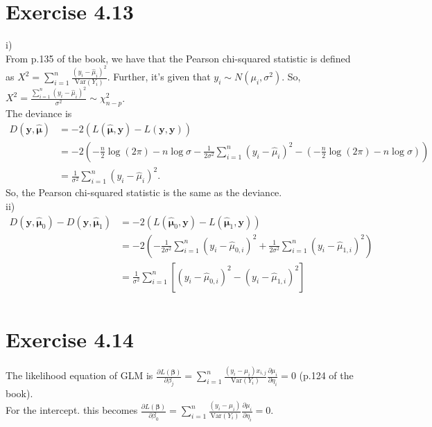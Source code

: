 \documentclass[a4paper]{article}
\newcommand{\Var}{\mathrm{Var}}
\begin{document}
\vspace{\baselineskip}
\section{Exercise 4.13}
i)\\
From p.135 of the book, we have that the Pearson chi-squared statistic is defined as $X^{2} = \sum_{i=1}^{n} \frac{(y_{i} - \widehat{\mu}_{i})^{2}}{\Var(Y_{i})}$. Further, it's given that $y_{i} \sim N(\mu_{i},\sigma^{2})$. So, $X^{2} = \frac{\sum_{i=1}^{n}(y_{i} - \widehat{\mu}_{i})^{2}}{\sigma^{2}} \sim \chi_{n-p}^{2}$.\\

The deviance is
\begin{align*}
D(\bm{y},\widehat{\bm{\mu}}) &= -2\left(L\left(\widehat{\bm{\mu}},\bm{y}\right) - L\left(\bm{y},\bm{y}\right)\right)\\
&= -2\left(-\frac{n}{2}\log(2\pi) -n\log\sigma - \frac{1}{2\sigma^{2}}\sum_{i=1}^{n}(y_{i} - \widehat{\mu}_{i})^{2} -\left(-\frac{n}{2}\log(2\pi) -n\log\sigma\right)\right)\\
&= \frac{1}{\sigma^{2}}\sum_{i=1}^{n}(y_{i} - \widehat{\mu}_{i})^{2}.
\end{align*}
So, the Pearson chi-squared statistic is the same as the deviance.\\

ii)
\begin{align*}
D(\bm{y},\widehat{\bm{\mu}}_{0}) - D(\bm{y},\widehat{\bm{\mu}}_{1}) &= -2\left(L\left(\widehat{\bm{\mu}}_{0},\bm{y}\right) - L\left(\widehat{\bm{\mu}}_{1},\bm{y}\right)\right)\\
&= -2\left(-\frac{1}{2\sigma^{2}}\sum_{i=1}^{n}(y_{i} - \widehat{\mu}_{0,i})^{2} +\frac{1}{2\sigma^{2}}\sum_{i=1}^{n}(y_{i} - \widehat{\mu}_{1,i})^{2}\right)\\
&= \frac{1}{\sigma^{2}}\sum_{i=1}^{n}\left[(y_{i} - \widehat{\mu}_{0,i})^{2} -(y_{i} - \widehat{\mu}_{1,i})^{2}\right]\\
\end{align*}


\vspace{\baselineskip}
\section{Exercise 4.14}
The likelihood equation of GLM is $\frac{\partial L(\bm{\beta})}{\partial \beta_{j}} = \sum_{i=1}^{n}\frac{(y_{i}-\mu_{i})x_{i,j}}{\Var(Y_{i})}\frac{\partial \mu_{i}}{\partial \eta_{i}} = 0$ (p.124 of the book).\\
For the intercept. this becomes 
$\frac{\partial L(\bm{\beta})}{\partial \beta_{0}} = \sum_{i=1}^{n}\frac{(y_{i}-\mu_{i})}{\Var(Y_{i})}\frac{\partial \mu_{i}}{\partial \eta_{i}} = 0$.\\
\end{document}
